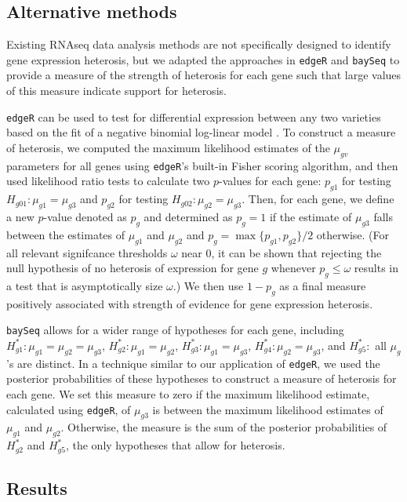 \documentclass[useAMS,usenatbib,referee]{biom}
\newcommand{\edgeR}{{\tt edgeR}}
\newcommand{\RNAseq}{RNAseq}
\begin{document}
\subsection{Alternative methods}
\label{s:alternative}

Existing \RNAseq{} data analysis methods are not specifically designed to identify gene expression heterosis, but we adapted the approaches in \edgeR{} and {\tt baySeq} to provide a measure of the strength of heterosis for each gene such that large values of this measure indicate support for heterosis.

\edgeR{} can be used to test for differential expression between any two varieties based on the fit of a negative binomial log-linear model \citep{robinson2007moderated, robinson2010edgeR}. To construct a measure of heterosis, we computed the maximum likelihood estimates of the $\mu_{gv}$ parameters for all genes using \edgeR{}'s built-in Fisher scoring algorithm, and then used likelihood ratio tests to calculate two $p$-values for each gene: $p_{g1}$  for testing $H_{g01}:\mu_{g1}=\mu_{g3}$ and $p_{g2}$ for testing $H_{g02}:\mu_{g2}=\mu_{g3}$. Then, for each gene, we define a new $p$-value denoted as $p_g$ and determined as $p_g=1$ if the estimate of $\mu_{g3}$ falls between the estimates of $\mu_{g1}$ and $\mu_{g2}$ and $p_g=\max\{p_{g1},p_{g2}\}/2$ otherwise.  (For all relevant signifcance thresholds $\omega$ near 0, it can be shown that rejecting the null hypothesis of no heterosis of expression for gene $g$ whenever $p_g\leq \omega$ results in a test that is asymptotically size $\omega$.)  We then use $1-p_g$ as a final measure positively associated with strength of evidence for gene expression heterosis. 

{\tt baySeq} allows for a wider range of hypotheses for each gene, including $H^*_{g1}: \mu_{g1}=\mu_{g2}=\mu_{g3}$, $H^*_{g 2}: \mu_{g1}=\mu_{g2}$, $H^*_{g 3}: \mu_{g1}=\mu_{g3}$, $H^*_{g 4}: \mu_{g2}=\mu_{g3}$, and $H^*_{g 5}:$ all $\mu_g$'s are distinct. In a technique similar to our application of \edgeR{}, we used the posterior probabilities of these hypotheses to construct a measure of heterosis for each gene. We set this measure to zero if the maximum likelihood estimate, calculated using \edgeR{}, of $\mu_{g3}$ is between the maximum likelihood estimates of $\mu_{g1}$ and $\mu_{g2}$. Otherwise, the measure is the sum of the posterior probabilities of $H^*_{g 2}$ and $H^*_{g 5}$, the only hypotheses that allow for heterosis.



\subsection{Results}
\end{document}
